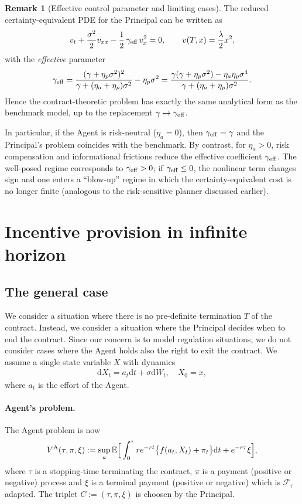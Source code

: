 \documentclass[a4paper,10pt]{article}
\newcommand{\E}{\mathbb{E}}
\newcommand{\dd}{\mathrm{d}}
\theoremstyle{definition}
\newtheorem{remark}[theorem]{Remark}
\theoremstyle{plain}
\numberwithin{equation}{section}
\begin{document}
\begin{remark}[Effective control parameter and limiting cases]
The reduced certainty-equivalent PDE for the Principal can be written as
\[
v_t+\frac{\sigma^2}{2}v_{xx}-\frac12\,\gamma_{\rm eff}\,v_x^2=0,
\qquad
v(T,x)=\frac{\lambda}{2}x^2,
\]
with the \emph{effective} parameter
\[
\gamma_{\rm eff}
=
\frac{(\gamma+\eta_p\sigma^2)^2}{\gamma+(\eta_a+\eta_p)\sigma^2}-\eta_p\sigma^2
=
\frac{\gamma(\gamma+\eta_p\sigma^2)-\eta_a\eta_p\sigma^4}{\gamma+(\eta_a+\eta_p)\sigma^2}.
\]
Hence the contract-theoretic problem has exactly the same analytical form as the benchmark model, up to the
replacement $\gamma\mapsto \gamma_{\rm eff}$.

In particular, if the Agent is risk-neutral ($\eta_a=0$), then $\gamma_{\rm eff}=\gamma$ and the Principal's
problem coincides with the benchmark. By contrast, for $\eta_a>0$, risk compensation and informational frictions
reduce the effective coefficient $\gamma_{\rm eff}$. The well-posed regime corresponds to $\gamma_{\rm eff}>0$;
if $\gamma_{\rm eff}\le 0$, the nonlinear term changes sign and one enters a ``blow-up'' regime in which the
certainty-equivalent cost is no longer finite (analogous to the risk-sensitive planner discussed earlier).
\end{remark}


\section{Incentive provision in infinite horizon}

\subsection{The general case}\label{ssec:general-infinite}

We consider a situation where there is no pre-definite termination $T$ of the contract. Instead, we consider a situation where the Principal decides when to end the contract. Since our concern is to model regulation situations, we do not consider cases where the Agent holds also the right to exit the contract. We assume a single state variable $X$ with dynamics
\begin{align*}
\dd X_t = a_t \dd t + \sigma \dd W_t, \quad X_0 = x,
\end{align*}
where $a_t$ is the effort of the Agent. 

\paragraph{Agent's problem.} The Agent problem is now
\begin{align}\label{eq:A}
V^{\rm A}(\tau,\pi,\xi) := \sup_{a} \E\Big[ \int_0^\tau r e^{- r t}\big\{ f(a_t,X_t) + \pi_t \big\} \dd t + e^{-r \tau} \xi \Big],
\end{align}
where $\tau$ is a stopping-time terminating the contract, $\pi$ is a payment (positive or negative) process and $\xi$ is a terminal payment (positive or negative) which is $\mathcal F_{\tau}$ adapted. The triplet $C := (\tau,\pi,\xi)$ is choosen by the Principal.
\end{document}
